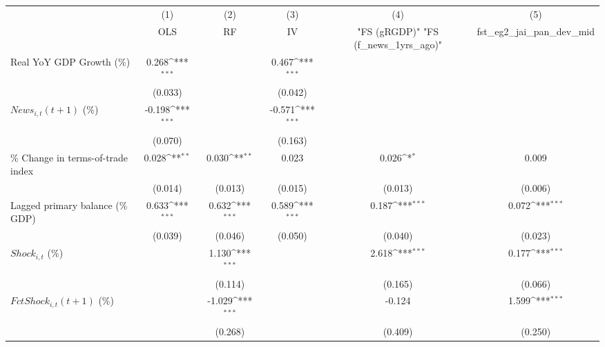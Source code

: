 {
\def\sym#1{\ifmmode^{#1}\else\(^{#1}\)\fi}
\begin{tabular}{l*{5}{c}}
\toprule
                    &\multicolumn{1}{c}{(1)}&\multicolumn{1}{c}{(2)}&\multicolumn{1}{c}{(3)}&\multicolumn{1}{c}{(4)}&\multicolumn{1}{c}{(5)}\\
                    &\multicolumn{1}{c}{OLS}&\multicolumn{1}{c}{RF}&\multicolumn{1}{c}{IV}&\multicolumn{1}{c}{ "FS (gRGDP)"  "FS (f_news_1yrs_ago)" }&\multicolumn{1}{c}{fst_eg2_jai_pan_dev_mid}\\
\midrule
Real YoY GDP Growth (\%)&       0.268\sym{***}&                     &       0.467\sym{***}&                     &                     \\
                    &     (0.033)         &                     &     (0.042)         &                     &                     \\
\addlinespace
$ News_{i,t}(t+1)$ (\%)&      -0.198\sym{***}&                     &      -0.571\sym{***}&                     &                     \\
                    &     (0.070)         &                     &     (0.163)         &                     &                     \\
\addlinespace
\% Change in terms-of-trade index&       0.028\sym{**} &       0.030\sym{**} &       0.023         &       0.026\sym{*}  &       0.009         \\
                    &     (0.014)         &     (0.013)         &     (0.015)         &     (0.013)         &     (0.006)         \\
\addlinespace
Lagged primary balance (\% GDP)&       0.633\sym{***}&       0.632\sym{***}&       0.589\sym{***}&       0.187\sym{***}&       0.072\sym{***}\\
                    &     (0.039)         &     (0.046)         &     (0.050)         &     (0.040)         &     (0.023)         \\
\addlinespace
$ Shock_{i,t}$ (\%) &                     &       1.130\sym{***}&                     &       2.618\sym{***}&       0.177\sym{***}\\
                    &                     &     (0.114)         &                     &     (0.165)         &     (0.066)         \\
\addlinespace
$ FctShock_{i,t}(t+1)$ (\%)&                     &      -1.029\sym{***}&                     &      -0.124         &       1.599\sym{***}\\
                    &                     &     (0.268)         &                     &     (0.409)         &     (0.250)         \\

\end{tabular}}
